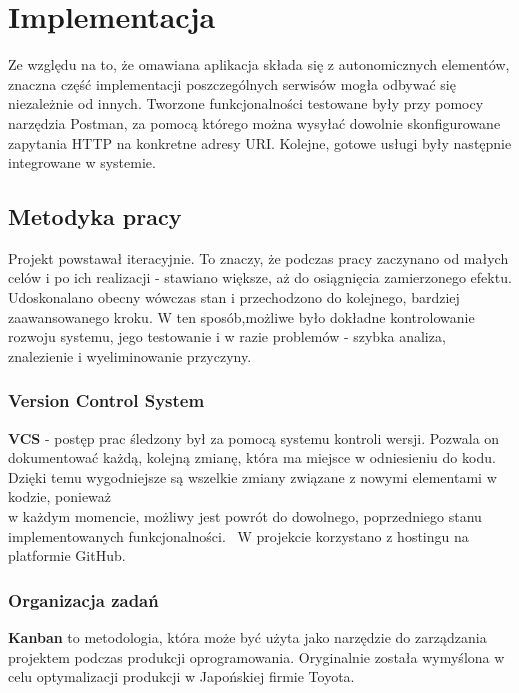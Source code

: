 \chapter{Implementacja}
\label{cha:implementacja}

Ze względu na to, że omawiana aplikacja składa się z autonomicznych elementów, znaczna część implementacji poszczególnych serwisów mogła odbywać się niezależnie od innych. Tworzone funkcjonalności testowane były przy pomocy narzędzia Postman, za pomocą którego można wysyłać dowolnie skonfigurowane zapytania HTTP na konkretne adresy URI. Kolejne, gotowe usługi były następnie integrowane w systemie.


\section{Metodyka pracy}
Projekt powstawał iteracyjnie. To znaczy, że podczas pracy zaczynano od małych celów i po ich realizacji - stawiano większe, aż do osiągnięcia zamierzonego efektu. Udoskonalano obecny wówczas stan i przechodzono do kolejnego, bardziej zaawansowanego kroku. W ten sposób,możliwe było dokładne kontrolowanie rozwoju systemu, jego testowanie i w razie problemów - szybka analiza, znalezienie i wyeliminowanie przyczyny. 

\subsection{Version Control System}
\textbf{VCS} - postęp prac śledzony był za pomocą systemu kontroli wersji.
Pozwala on dokumentować każdą, kolejną zmianę, która ma miejsce w odniesieniu do kodu. Dzięki temu wygodniejsze są wszelkie zmiany związane z nowymi elementami w kodzie, ponieważ\\w każdym momencie, możliwy jest powrót do dowolnego, poprzedniego stanu implementowanych funkcjonalności.~\cite{vcs}
W projekcie korzystano z hostingu na platformie GitHub.

\subsection{Organizacja zadań}
\textbf{Kanban} to metodologia, która może być użyta jako narzędzie do zarządzania projektem podczas produkcji oprogramowania. Oryginalnie została wymyślona w celu optymalizacji produkcji w Japońskiej firmie Toyota.

